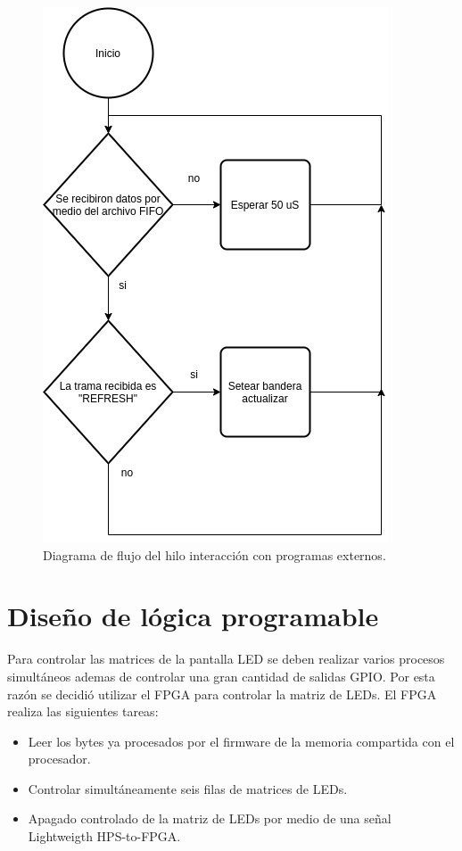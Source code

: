 \begin{figure}[htpb]
	\centering
	\includegraphics[scale=0.6]{Figures/hilo3.jpg} 
	\caption{Diagrama de flujo del hilo interacción con programas externos.}
	\label{fig: hilofifo}
\end{figure}
\pagebreak

\section{ Diseño de lógica programable}
Para controlar las matrices de la pantalla LED se deben realizar varios procesos simultáneos ademas de controlar una gran cantidad de salidas GPIO. Por esta razón se decidió utilizar el FPGA para controlar la matriz de LEDs.
El FPGA realiza las siguientes tareas:
\begin{itemize}
\item Leer los bytes ya procesados por el firmware de la memoria compartida con el procesador. 
\item Controlar simultáneamente seis filas de matrices de LEDs.
\item Apagado controlado de la matriz de LEDs por medio de una señal Lightweigth HPS-to-FPGA.
\end{itemize}

